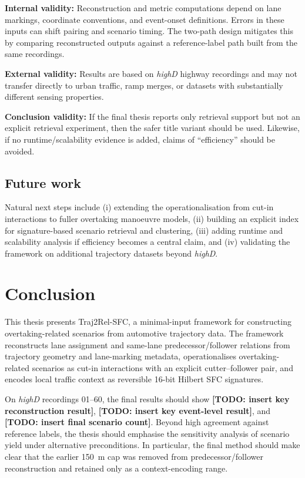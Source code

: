 \documentclass[12pt,a4paper,twoside,openright]{report}
\newcommand{\TODO}[1]{\textbf{[TODO: #1]}}
\newcommand{\FrameworkName}{Traj2Rel-SFC}
\begin{document}
    \textbf{Internal validity:} Reconstruction and metric computations depend on lane markings, coordinate conventions, and event-onset definitions. Errors in these inputs can shift pairing and scenario timing. The two-path design mitigates this by comparing reconstructed outputs against a reference-label path built from the same recordings.

    \textbf{External validity:} Results are based on \textit{highD} highway recordings and may not transfer directly to urban traffic, ramp merges, or datasets with substantially different sensing properties.

    \textbf{Conclusion validity:} If the final thesis reports only retrieval support but not an explicit retrieval experiment, then the safer title variant should be used. Likewise, if no runtime/scalability evidence is added, claims of ``efficiency'' should be avoided.

    \section{Future work}
    Natural next steps include (i) extending the operationalisation from cut-in interactions to fuller overtaking manoeuvre models, (ii) building an explicit index for signature-based scenario retrieval and clustering, (iii) adding runtime and scalability analysis if efficiency becomes a central claim, and (iv) validating the framework on additional trajectory datasets beyond \textit{highD}.

    \chapter{Conclusion}
    \label{chap:conclusion}

    This thesis presents \FrameworkName{}, a minimal-input framework for constructing overtaking-related scenarios from automotive trajectory data. The framework reconstructs lane assignment and same-lane predecessor/follower relations from trajectory geometry and lane-marking metadata, operationalises overtaking-related scenarios as cut-in interactions with an explicit cutter--follower pair, and encodes local traffic context as reversible 16-bit Hilbert SFC signatures.

    On \textit{highD} recordings 01--60, the final results should show \TODO{insert key reconstruction result}, \TODO{insert key event-level result}, and \TODO{insert final scenario count}. Beyond high agreement against reference labels, the thesis should emphasise the sensitivity analysis of scenario yield under alternative preconditions. In particular, the final method should make clear that the earlier \SI{150}{\meter} cap was removed from predecessor/follower reconstruction and retained only as a context-encoding range.
\end{document}

